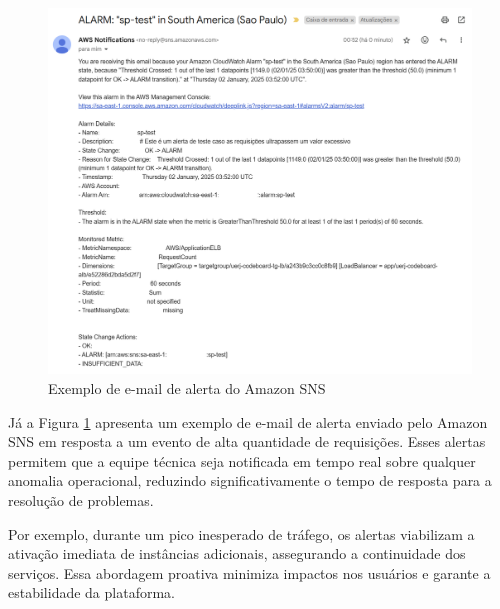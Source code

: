 \begin{figure}[H]
    \centering
    \includegraphics[width=1\textwidth]{assets/monitoring-test/cloudwatch-alarm-email.png}
    \caption{Exemplo de e-mail de alerta do Amazon SNS}
    \label{fig:cloudwatch-alarm-email}
\end{figure}

Já a Figura \ref{fig:cloudwatch-alarm-email} apresenta um exemplo de e-mail de alerta enviado pelo Amazon SNS em resposta a um evento de alta quantidade de requisições. Esses alertas permitem que a equipe técnica seja notificada em tempo real sobre qualquer anomalia operacional, reduzindo significativamente o tempo de resposta para a resolução de problemas.

Por exemplo, durante um pico inesperado de tráfego, os alertas viabilizam a ativação imediata de instâncias adicionais, assegurando a continuidade dos serviços. Essa abordagem proativa minimiza impactos nos usuários e garante a estabilidade da plataforma.
